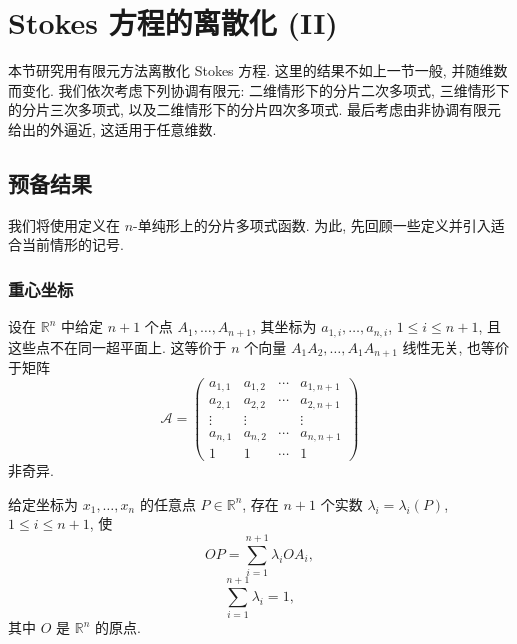 \clearpage
\section{Stokes 方程的离散化 (II)}
\label{sec:ch1-stokes-discretization-ii}

本节研究用有限元方法离散化 Stokes 方程. 这里的结果不如上一节一般, 并随维数而变化. 我们依次考虑下列协调有限元: 二维情形下的分片二次多项式, 三维情形下的分片三次多项式, 以及二维情形下的分片四次多项式. 最后考虑由非协调有限元给出的外逼近, 这适用于任意维数.

\subsection{预备结果}
\label{subsec:ch1-finite-element-preliminaries}

我们将使用定义在 $n$-单纯形上的分片多项式函数. 为此, 先回顾一些定义并引入适合当前情形的记号.

\subsubsection*{重心坐标}

设在 $\mathbb R^n$ 中给定 $n+1$ 个点 $A_1,\ldots,A_{n+1}$, 其坐标为 $a_{1,i},\ldots,a_{n,i}$, $1\leq i\leq n+1$, 且这些点不在同一超平面上. 这等价于 $n$ 个向量 $A_1A_2,\ldots,A_1A_{n+1}$ 线性无关, 也等价于矩阵
\begin{equation}
\mathcal A=
\begin{pmatrix}
a_{1,1}&a_{1,2}&\cdots&a_{1,n+1}\\
a_{2,1}&a_{2,2}&\cdots&a_{2,n+1}\\
\vdots&\vdots&&\vdots\\
a_{n,1}&a_{n,2}&\cdots&a_{n,n+1}\\
1&1&\cdots&1
\end{pmatrix}
\label{eq:ch1-simplex-coordinate-matrix}
\end{equation}
非奇异.

给定坐标为 $x_1,\ldots,x_n$ 的任意点 $P\in\mathbb R^n$, 存在 $n+1$ 个实数 $\lambda_i=\lambda_i(P)$, $1\leq i\leq n+1$, 使
\begin{equation}
OP=\sum_{i=1}^{n+1}\lambda_iOA_i,
\label{eq:ch1-barycentric-position}
\end{equation}
\begin{equation}
\sum_{i=1}^{n+1}\lambda_i=1,
\label{eq:ch1-barycentric-sum}
\end{equation}
其中 $O$ 是 $\mathbb R^n$ 的原点.


